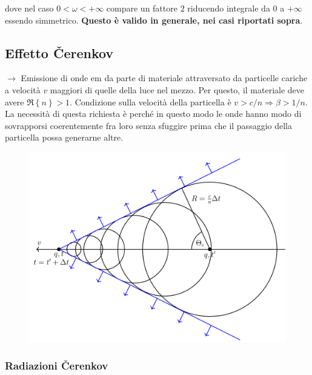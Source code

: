 \documentclass[10pt, a4paper]{scrartcl}
\numberwithin{equation}{subsection}
\theoremstyle{style1}
\begin{document}
dove nel caso $0 < \omega<+\infty$ compare un fattore $2$ riducendo integrale da $0$ a $+\infty$ essendo simmetrico. \textbf{Questo \`e valido in generale, nei casi riportati sopra}.
\subsection{Effetto \v Cerenkov}
$\to $ Emissione di onde em da parte di materiale attraversato da particelle cariche a velocit\`a $v$ maggiori di quelle della luce nel mezzo. Per questo, il materiale deve avere $\Re\left\{ n \right\} > 1$. Condizione sulla velocit\`a della particella \`e $v > c / n\Rightarrow  \beta  > 1 / n$. La necessit\`a di questa richiesta \`e perch\'e in questo modo le onde hanno modo di sovrapporsi coerentemente fra loro senza sfuggire prima che il passaggio della particella possa generarne altre.
\begin{figure}[h!]
	\centering
	\includegraphics[width=.5\columnwidth]{c1.png}
\end{figure}

\subsubsection{Radiazioni \v Cerenkov}
\end{document}

